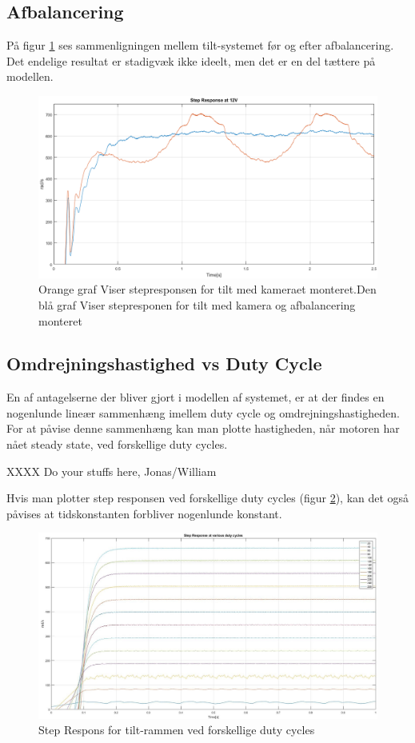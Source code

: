 \subsection{Afbalancering}

På figur \ref{fig:Balanced_Response} ses sammenligningen mellem tilt-systemet før og efter afbalancering. Det endelige resultat er stadigvæk ikke ideelt, men det er en del tættere på modellen.

\begin{figure}[!ht]
	\begin{center}
		\includegraphics[scale=0.45]{Billeder/balanced_vs_unbalanced.png}
	\end{center}
	\caption{Orange graf Viser stepresponsen for tilt med kameraet monteret.Den blå graf Viser stepresponen for tilt med kamera og afbalancering monteret}
	\label{fig:Balanced_Response}
\end{figure}

\subsection{Omdrejningshastighed vs Duty Cycle}

En af antagelserne der bliver gjort i modellen af systemet, er at der findes en nogenlunde lineær sammenhæng imellem duty cycle og omdrejningshastigheden. For at påvise denne sammenhæng kan man plotte hastigheden, når motoren har nået steady state, ved forskellige duty cycles. 

XXXX Do your stuffs here, Jonas/William

Hvis man plotter step responsen ved forskellige duty cycles (figur \ref{fig:RPM_DC}), kan det også påvises at tidskonstanten forbliver nogenlunde konstant. 

\begin{figure}[!ht]
	\begin{center}
		\includegraphics[scale=0.35]{Billeder/RPM_vs_DC.jpg}
	\end{center}
	\caption{Step Respons for tilt-rammen ved forskellige duty cycles}
	\label{fig:RPM_DC}
\end{figure}
